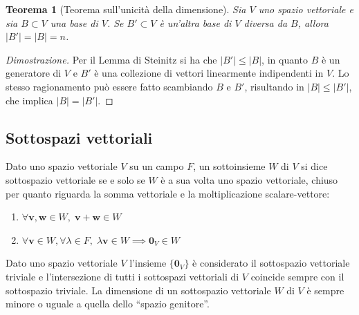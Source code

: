 \documentclass{article}
\newtheorem{theorem}{Teorema}
\begin{document}
    \vspace{10pt}
    \begin{theorem}[Teorema sull'unicità della dimensione]
        Sia $V$ uno spazio vettoriale e sia $B \subset V$ una base di $V$. Se $B' \subset V$ è un'altra base di $V$ diversa da $B$, allora $|B'| = |B| = n$.
    \end{theorem}

    \begin{proof}[Dimostrazione]
       Per il Lemma di Steinitz si ha che $|B'| \leq |B|$, in quanto $B$ è un generatore di $V$ e $B'$ è una collezione di vettori linearmente indipendenti in $V$.
       Lo stesso ragionamento può essere fatto scambiando $B$ e $B'$, risultando in $|B| \leq |B'|$, che implica $|B| = |B'|$.
    \end{proof}



\vspace{10pt}
\subsection{Sottospazi vettoriali} \label{subsec:vssubspaces}
    Dato uno spazio vettoriale $V$ su un campo $F$, un sottoinsieme $W$ di $V$ si dice sottospazio vettoriale se e solo se $W$ è a sua volta uno spazio vettoriale, chiuso per quanto riguarda 
    la somma vettoriale e la moltiplicazione scalare-vettore:

    \begin{enumerate}[label=(\arabic*)]
        \item $\forall \mathbf{v}, \mathbf{w} \in W, \; \mathbf{v} + \mathbf{w} \in W$ 
        \item $\forall \mathbf{v} \in W, \forall \lambda \in F, \; \lambda \mathbf{v} \in W \implies \mathbf{0}_V \in W$
    \end{enumerate}
    
    Dato uno spazio vettoriale $V$ l'insieme $\{\mathbf{0}_V\}$ è considerato il sottospazio vettoriale triviale e l'intersezione di tutti i sottospazi
    vettoriali di $V$ coincide sempre con il sottospazio triviale. La dimensione di un sottospazio vettoriale $W$ di $V$ è sempre minore o uguale a quella dello ``spazio genitore''.
\end{document}
